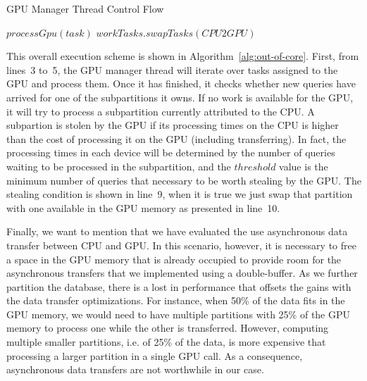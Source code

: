 \begin{algorithm}[h]
\caption{GPU Manager Thread Control Flow}
\label{alg:out-of-core}
\begin{algorithmic}[1]
{}
            \State $processGpu(task)$
	    \EndFor
        \EndIf
	       \State $workTasks.swapTasks(CPU2GPU)$
	    \EndIf
    \EndWhile
\EndProcedure
\end{algorithmic}
\end{algorithm}

This overall execution scheme is shown in Algorithm~\ref{alg:out-of-core}. First,
from lines~3 to~5, the GPU manager thread will iterate over tasks assigned to the GPU and 
process them. Once it has finished, it checks whether new queries have arrived for one of
the subpartitions it owns. If no work
is available for the GPU, it will try to process a subpartition currently attributed to the 
CPU. A subpartion is stolen by the GPU if its processing times on the CPU is higher 
than the cost of processing it on the GPU (including transferring). In fact, the processing
times in each device will be determined by the number of queries waiting to be processed
in the subpartition, and the $threshold$ value is the minimum number of queries that necessary
to be worth stealing by the GPU. The stealing condition is shown in line~9, when it is true
we just swap that partition with one available in the GPU memory as presented in line~10.

Finally, we want to mention that we have evaluated the use asynchronous data transfer between 
CPU and GPU. In this scenario, however, it is necessary to free a space in the GPU memory that
is already occupied to provide room for the asynchronous transfers that we implemented
using a double-buffer. As we further partition the database, there is a lost in performance
that offsets the gains with the data transfer optimizations. For instance, when 50\% of
the data fits in the GPU memory, we would need to have multiple partitions with 25\% of
the GPU memory to process one while the other is transferred. However, computing multiple
smaller partitions, i.e. of 25\% of the data, is more expensive that processing a larger
partition in a single GPU call. As a consequence, asynchronous data transfers are not 
worthwhile in our case.





